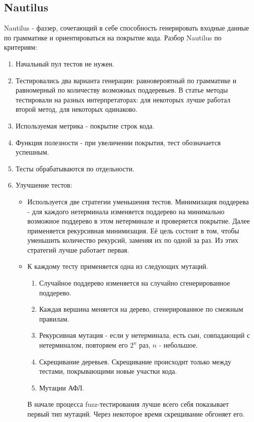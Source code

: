 \documentclass[a4paper]{article}
\begin{document}
\subsection{Nautilus}
\indent
Nautilus\cite{litlink6} - фаззер, сочетающий в себе способность генерировать входные данные по грамматике и ориентироваться на покрытие кода. Разбор Nautilus по критериям:

\begin{enumerate}
\item Начальный пул тестов не нужен.
\item Тестировались два варианта генерации: равновероятный по грамматике и равномерный по количеству возможных поддеревьев. В статье методы тестировали на разных интерпретаторах: для некоторых лучше работал второй метод, для некоторых одинаково.
\item Используемая метрика - покрытие строк кода.
\item Функция полезности - при увеличении покрытия, тест обозначается успешным.
\item Тесты обрабатываются по отдельности.
\item Улучшение тестов:
    \begin{itemize}
        \item Используется две стратегии уменьшения тестов. Минимизация поддерева - для каждого нетерминала изменяется поддерево на минимально возможное поддерево в этом нетерминале и проверяется покрытие. Далее применяется рекурсивная минимизация. Её цель состоит в том, чтобы уменьшить количество рекурсий, заменяя их по одной за раз. Из этих стратегий лучше работает первая.
        \item К каждому тесту применяется одна из следующих мутаций. 
        \begin{enumerate}    
        \item Случайное поддерево изменяется на случайно сгенерированное поддерево.
        \item Каждая вершина меняется на дерево, сгенерированное по смежным правилам.
        \item Рекурсивная мутация - если у нетерминала, есть сын, совпадающий с нетерминалом, повторяем его $ 2^n $ раз, $ n $ - небольшое.
        \item Скрещивание деревьев. Скрещивание происходит только между тестами, покрывающими новые участки кода.
        \item Мутации АФЛ.
        \end{enumerate}
        В начале процесса fuzz-тестирования лучше всего себя показывает первый тип мутаций. Через некоторое время скрещивание обгоняет его.
    \end{itemize}
\end{enumerate}
\end{document}
